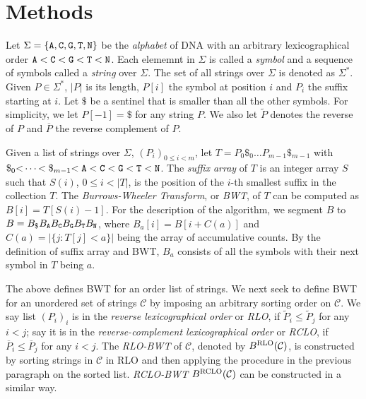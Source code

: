 \documentclass{bioinfo-pre}
\begin{document}
\section{Methods}
\begin{methods}
Let $\Sigma=\{{\tt A},{\tt C},{\tt G},{\tt T},{\tt N}\}$ be the \emph{alphabet}
of DNA with an arbitrary lexicographical order
${\tt A\char60C\char60G\char60T\char60N}$. Each elememnt in $\Sigma$ is
called a \emph{symbol} and a sequence of symbols called a \emph{string} over
$\Sigma$. The set of all strings over $\Sigma$ is denoted as $\Sigma^*$. Given
$P\in\Sigma^*$, $|P|$ is its length, $P[i]$ the symbol at position $i$ and
$P_i$ the suffix starting at $i$. Let $\$$ be a sentinel that is smaller than
all the other symbols. For simplicity, we let $P[-1]=\$$ for any string $P$. We
also let $\widetilde{P}$ denotes the reverse of $P$ and $\overline{P}$ the
reverse complement of $P$.

Given a list of strings over $\Sigma$, $(P_i)_{0\le i<m}$, let
$T=P_0\$_0\ldots P_{m-1}\$_{m-1}$ with
${\tt\char36}_0{\tt\char60}\cdots{\char60\tt\char36}_{m-1}{\tt\char60A\char60C\char60G\char60T\char60N}$.
The \emph{suffix array} of $T$ is an integer array $S$ such that $S(i)$,
\mbox{$0\le i<|T|$}, is the position of the $i$-th smallest suffix in the
collection $T$.  The \emph{Burrows-Wheeler Transform}, or \emph{BWT}, of $T$
can be computed as \mbox{$B[i]=T[S(i)-1]$}. For the description of the
algorithm, we segment $B$ to \mbox{$B=B_{\tt\$}B_{\tt A}B_{\tt C}B_{\tt
G}B_{\tt T}B_{\tt N}$}, where \mbox{$B_a[i]=B[i+C(a)]$} and
\mbox{$C(a)=|\{j:T[j]<a\}|$} being the array of accumulative counts. By the
definition of suffix array and BWT, $B_a$ consists of all the symbols with
their next symbol in $T$ being $a$.

The above defines BWT for an order list of strings. We next seek to define BWT
for an unordered set of strings $\mathcal{C}$ by imposing an arbitrary sorting
order on $\mathcal{C}$.  We say list $(P_i)_i$ is in the \emph{reverse
lexicographical order} or \emph{RLO}, if $\widetilde{P}_i\le\widetilde{P}_j$
for any $i<j$; say it is in the \emph{reverse-complement lexicographical order}
or \emph{RCLO}, if $\overline{P}_i\le\overline{P}_j$ for any $i<j$.
The \emph{RLO-BWT} of $\mathcal{C}$, denoted by $B^{\rm RLO}(\mathcal{C})$,
is constructed by sorting strings in $\mathcal{C}$ in RLO and then applying
the procedure in the previous paragraph on the sorted list. \emph{RCLO-BWT}
$B^{\rm RCLO}(\mathcal{C})$ can be constructed in a similar way.


\end{methods}
\end{document}
